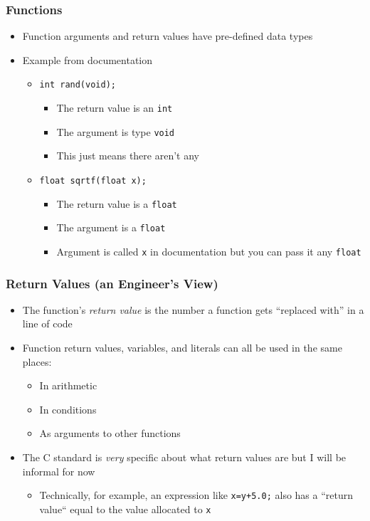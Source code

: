 \documentclass[14pt]{beamer}
\begin{document}
\begin{frame}
\frametitle{Functions}
\begin{itemize}
\item Function arguments and return values have pre-defined data types
\pause
\item Example from documentation
\begin{itemize}
\item \texttt{int~rand(void);}
	\begin{itemize}
		\item The return value is an \texttt{int}
		\item The argument is type \texttt{void}
		\item This just means there aren't any
	\end{itemize}
\pause
\item \texttt{float sqrtf(float x);}
	\begin{itemize}
		\item The return value is a \texttt{float}
		\item The argument is a \texttt{float}
		\item Argument is called \texttt{x} in documentation but you can pass it any \texttt{float}
	\end{itemize}
\end{itemize}
\end{itemize}
\end{frame}

\begin{frame}
\frametitle{Return Values (an Engineer's View)}
\begin{itemize}
\item The function's \textit{return value} is the number a function gets ``replaced with'' in a line of code
\pause
\item Function return values, variables, and literals can all be used in the same places:
	\begin{itemize}
		\item In arithmetic
		\item In conditions
		\item As arguments to other functions
	\end{itemize}	 
\pause
\item The C standard is \textit{very} specific about what return values are but I will be informal for now
	\begin{itemize}
		\item Technically, for example, an expression like \texttt{x=y+5.0;} also has a ``return value`` equal to the value allocated to \texttt{x}
	\end{itemize}
\end{itemize}
\end{frame}
\end{document}
